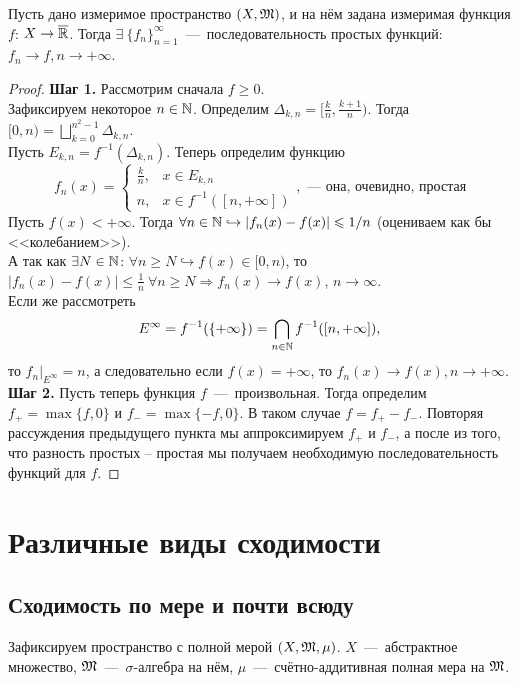 \begin{theorem}
    Пусть дано измеримое пространство $(X, \mathfrak{M})$, и на нём задана измеримая функция $f$: $X \rightarrow \overline{\mathbb{R}}$. Тогда $\exists \ \{f_n\}_{n = 1}^\infty$~---~последовательность простых функций: $f_n \xrightarrow{} f, n \rightarrow +\infty$.
\end{theorem}
\begin{proof}
\textbf{Шаг 1.} Рассмотрим сначала $f \geq 0$. \\
    Зафиксируем некоторое $n \in \mathbb{N}$. Определим $\Delta_{k, n} = [\frac{k}{n}, \frac{k + 1}{n})$. Тогда $[0, n) = \bigsqcup\limits_{k = 0}^{n^2 - 1} \Delta_{k, n}$. \\
    Пусть $E_{k, n} = f^{-1}(\Delta_{k, n})$. Теперь определим функцию 
    \[
    f_n(x) = 
    \begin{cases}
        \frac{k}{n}, &  x \in E_{k, n} \\
         n, &  x \in f^{-1}([n, +\infty])
    \end{cases},\text{~---~она, очевидно, простая}
    \]
    Пусть $f(x) < +\infty$. Тогда $\forall n \in \mathbb{N} \hookrightarrow | f_n(x) - f(x) | \leqslant 1 / n$ (оцениваем как бы <<колебанием>>).\\
    А так как $\exists N \in \mathbb{N}$: $\forall n \geq N \hookrightarrow f(x) \in [0, n)$, то $ |f_n(x) - f(x)| \leq \frac{1}{n}\  \forall n \geq N \Rightarrow f_n(x) \xrightarrow{} f(x)$, $n \to \infty$.\\
    Если же рассмотреть \[E^\infty = f^{-1}(\{+\infty\}) = \bigcap\limits_{n \in \mathbb{N}} f^{-1}([n, +\infty]),\]
    то $f_n|_{E^\infty} = n$, а следовательно если $f(x) = +\infty$, то $f_n(x) \rightarrow f(x), n \rightarrow +\infty$. \\
    \textbf{Шаг 2.} Пусть теперь функция $f$~---~произвольная. Тогда определим $f_+ = \max\{f, 0\}$ и $f_- = \max\{-f, 0\}$. В таком случае $f = f_+ - f_-$. Повторяя рассуждения предыдущего пункта мы аппроксимируем $f_+$ и $f_-$, а после из того, что разность простых -- простая мы получаем необходимую последовательность функций для $f$.
\end{proof}

\section{Различные виды сходимости}
\subsection{Сходимость по мере и почти всюду}
Зафиксируем пространство с полной мерой $(X, \mathfrak{M}, \mu)$. $X$~---~абстрактное множество, $\mathfrak{M}$~---~$\sigma$-алгебра на нём, $\mu$~---~счётно-аддитивная полная мера на $\mathfrak{M}$.

